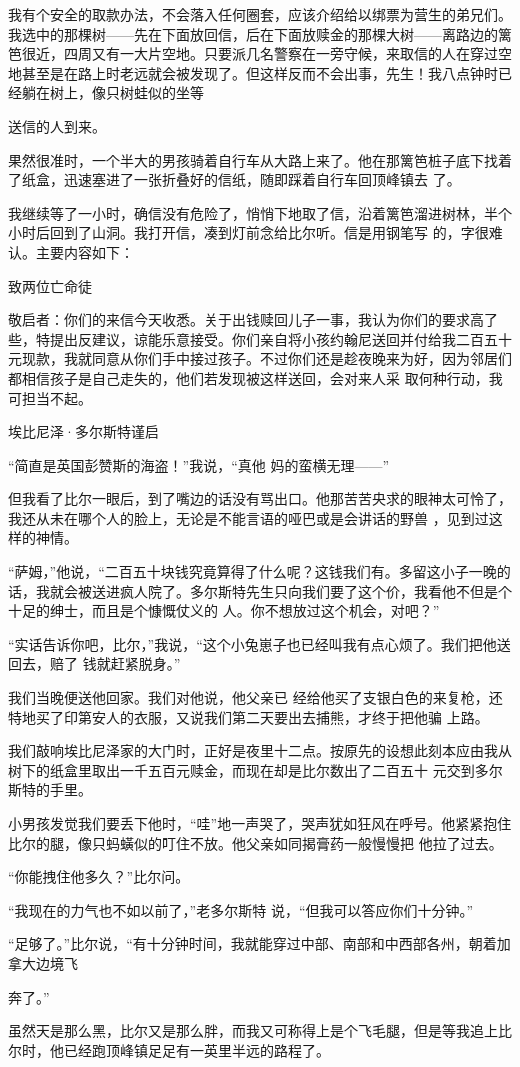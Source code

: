 \documentclass{article}
\begin{document}
我有个安全的取款办法，不会落入任何圈套，应该介绍给以绑票为营生的弟兄们。我选中的那棵树——先在下面放回信，后在下面放赎金的那棵大树——离路边的篱笆很近，四周又有一大片空地。只要派几名警察在一旁守候，来取信的人在穿过空地甚至是在路上时老远就会被发现了。但这样反而不会出事，先生！我八点钟时已经躺在树上，像只树蛙似的坐等

\newpage
送信的人到来。 

果然很准时，一个半大的男孩骑着自行车从大路上来了。他在那篱笆桩子底下找着了纸盒，迅速塞进了一张折叠好的信纸，随即踩着自行车回顶峰镇去
了。 

我继续等了一小时，确信没有危险了，悄悄下地取了信，沿着篱笆溜进树林，半个小时后回到了山洞。我打开信，凑到灯前念给比尔听。信是用钢笔写
的，字很难认。主要内容如下： 


致两位亡命徒 

敬启者：你们的来信今天收悉。关于出钱赎回儿子一事，我认为你们的要求高了些，特提出反建议，谅能乐意接受。你们亲自将小孩约翰尼送回并付给我二百五十元现款，我就同意从你们手中接过孩子。不过你们还是趁夜晚来为好，因为邻居们都相信孩子是自己走失的，他们若发现被这样送回，会对来人采
取何种行动，我可担当不起。 

\newpage


埃比尼泽·多尔斯特谨启 

“简直是英国彭赞斯的海盗！”我说，“真他
妈的蛮横无理——” 

但我看了比尔一眼后，到了嘴边的话没有骂出口。他那苦苦央求的眼神太可怜了，我还从未在哪个人的脸上，无论是不能言语的哑巴或是会讲话的野兽
，见到过这样的神情。 

“萨姆，”他说，“二百五十块钱究竟算得了什么呢？这钱我们有。多留这小子一晚的话，我就会被送进疯人院了。多尔斯特先生只向我们要了这个价，我看他不但是个十足的绅士，而且是个慷慨仗义的
人。你不想放过这个机会，对吧？” 

“实话告诉你吧，比尔，”我说，“这个小兔崽子也已经叫我有点心烦了。我们把他送回去，赔了
钱就赶紧脱身。” 

我们当晚便送他回家。我们对他说，他父亲已
\newpage
经给他买了支银白色的来复枪，还特地买了印第安人的衣服，又说我们第二天要出去捕熊，才终于把他骗
上路。 

我们敲响埃比尼泽家的大门时，正好是夜里十二点。按原先的设想此刻本应由我从树下的纸盒里取出一千五百元赎金，而现在却是比尔数出了二百五十
元交到多尔斯特的手里。 

小男孩发觉我们要丢下他时，“哇”地一声哭了，哭声犹如狂风在呼号。他紧紧抱住比尔的腿，像只蚂蟥似的叮住不放。他父亲如同揭膏药一般慢慢把
他拉了过去。 


“你能拽住他多久？”比尔问。 

“我现在的力气也不如以前了，”老多尔斯特
说，“但我可以答应你们十分钟。” 

“足够了。”比尔说，“有十分钟时间，我就能穿过中部、南部和中西部各州，朝着加拿大边境飞
\newpage

奔了。” 

虽然天是那么黑，比尔又是那么胖，而我又可称得上是个飞毛腿，但是等我追上比尔时，他已经跑顶峰镇足足有一英里半远的路程了。
\end{document}
